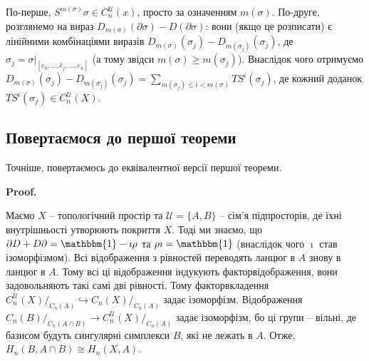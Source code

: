 \documentclass[a4paper, 10pt]{article}
\makeatletter
\theoremstyle{theoremdd}
\theoremstyle{theoremdd}
\theoremstyle{theoremdd}
\theoremstyle{theoremdd}
\theoremstyle{theoremdd}
\theoremstyle{theoremdd}
\theoremstyle{theoremdd}
\theoremstyle{theoremdd}
\theoremstyle{theoremdd}
\theoremstyle{theoremdd}
\theoremstyle{theoremdd}
\theoremstyle{theoremdd}
\theoremstyle{theoremdd}
\theoremstyle{theoremdd}
\theoremstyle{theoremdd}
\renewenvironment{proof}[1][Proof.\\]{\par
\pushQED{\hfill \qed}%
\normalfont \topsep6\p@\@plus6\p@\relax
\trivlist
\item\relax
{\bfseries
#1\@addpunct{.}}\hspace\labelsep\ignorespaces
}{%
\popQED\endtrivlist\@endpefalse
}
\makeatother
\begin{document}
По-перше, $S^{m(\sigma)}\sigma \in C_n^{\mathcal{U}}(x)$, просто за означенням $m(\sigma)$. По-друге, розглянемо на вираз $D_{m(\sigma)} (\partial \sigma) - D(\partial \sigma)$: вони (якщо це розписати) є лінійними комбінаціями виразів $D_{m(\sigma)}(\sigma_j) - D_{m(\sigma_j)}(\sigma_j)$, де $\sigma_j = \sigma|_{[e_0,\dots,\hat{e}_j,\dots,e_n]}$ (а тому звідси $m(\sigma) \geq m(\sigma_j)$). Внаслідок чого отримуємо $D_{m(\sigma)}(\sigma_j) - D_{m(\sigma_j)}(\sigma_j) = \displaystyle\sum_{m(\sigma_j) \leq i < m(\sigma)} TS^{i}(\sigma_j)$, де кожний доданок $TS^i(\sigma_j) \in C_n^\mathcal{U}(X)$.

\subsection*{Повертаємося до першої теореми}
Точніше, повертаємось до еквівалентної версії першої теореми.
\begin{proof}
Маємо $X$ -- топологічний простір та $\mathcal{U} = \{A,B\}$ -- сім'я підпросторів, де їхні внутрішньості утворюють покриття $X$. Тоді ми знаємо, що $\partial D + D \partial = \mathbbm{1} - \imath \rho$ та $\rho \imath = \mathbbm{1}$ (внаслідок чого $\imath$ став ізоморфізмом). Всі відображення з рівностей переводять ланцюг в $A$ знову в ланцюг в $A$. Тому всі ці відображення індукують факторвідображення, вони задовольняють такі самі дві рівності. Тому факторвкладення $C_n^\mathcal{U}(X)/_{C_n(A)} \hookrightarrow C_n(X)/_{C_n(A)}$ задає ізоморфізм. Відображення ${C_n(B)}/_{C_n(A \cap B)} \to {C_n^\mathcal{U}(X)}/_{C_n(A)}$ задає ізоморфізм, бо ці групи -- вільні, де базисом будуть сингулярні симплекси $B$, які не лежать в $A$. Отже, $H_n(B, A \cap B) \cong H_n(X,A)$. 
\end{proof}
\end{document}
